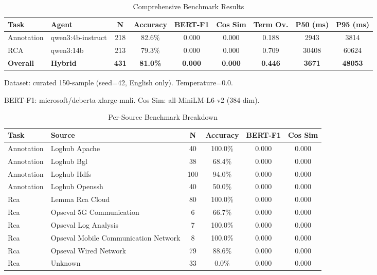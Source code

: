 
\begin{table}[h]
\centering
\caption{Comprehensive Benchmark Results}
\label{tab:comprehensive-results}
\begin{tabular}{llccccccc}
\toprule
\textbf{Task} & \textbf{Agent} & \textbf{N} & \textbf{Accuracy} & \textbf{BERT-F1} & \textbf{Cos Sim} & \textbf{Term Ov.} & \textbf{P50 (ms)} & \textbf{P95 (ms)} \\
\midrule
Annotation & qwen3:4b-instruct & 218 & 82.6\% & 0.000 & 0.000 & 0.188 & 2943 & 3814 \\
RCA & qwen3:14b & 213 & 79.3\% & 0.000 & 0.000 & 0.709 & 30408 & 60624 \\
\midrule
\textbf{Overall} & \textbf{Hybrid} & \textbf{431} & \textbf{81.0\%} & \textbf{0.000} & \textbf{0.000} & \textbf{0.446} & \textbf{3671} & \textbf{48053} \\
\bottomrule
\end{tabular}
\begin{tablenotes}
\small
\item Dataset: curated 150-sample (seed=42, English only). Temperature=0.0.
\item BERT-F1: microsoft/deberta-xlarge-mnli. Cos Sim: all-MiniLM-L6-v2 (384-dim).
\end{tablenotes}
\end{table}


\begin{table}[h]
\centering
\caption{Per-Source Benchmark Breakdown}
\label{tab:per-source}
\begin{tabular}{llcccc}
\toprule
\textbf{Task} & \textbf{Source} & \textbf{N} & \textbf{Accuracy} & \textbf{BERT-F1} & \textbf{Cos Sim} \\
\midrule
Annotation & Loghub Apache & 40 & 100.0\% & 0.000 & 0.000 \\
Annotation & Loghub Bgl & 38 & 68.4\% & 0.000 & 0.000 \\
Annotation & Loghub Hdfs & 100 & 94.0\% & 0.000 & 0.000 \\
Annotation & Loghub Openssh & 40 & 50.0\% & 0.000 & 0.000 \\
Rca & Lemma Rca Cloud & 80 & 100.0\% & 0.000 & 0.000 \\
Rca & Opseval 5G Communication & 6 & 66.7\% & 0.000 & 0.000 \\
Rca & Opseval Log Analysis & 7 & 100.0\% & 0.000 & 0.000 \\
Rca & Opseval Mobile Communication Network & 8 & 100.0\% & 0.000 & 0.000 \\
Rca & Opseval Wired Network & 79 & 88.6\% & 0.000 & 0.000 \\
Rca & Unknown & 33 & 0.0\% & 0.000 & 0.000 \\
\bottomrule
\end{tabular}
\end{table}


